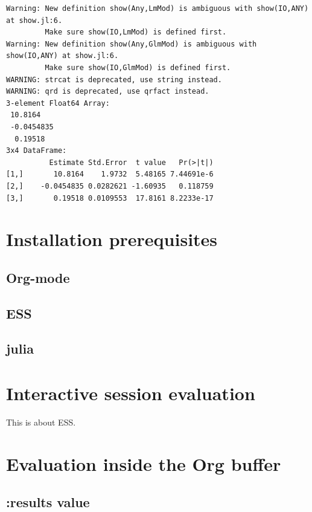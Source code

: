 \documentclass[11pt]{article}
\begin{document}
\begin{verbatim}
Warning: New definition show(Any,LmMod) is ambiguous with show(IO,ANY) at show.jl:6.
         Make sure show(IO,LmMod) is defined first.
Warning: New definition show(Any,GlmMod) is ambiguous with show(IO,ANY) at show.jl:6.
         Make sure show(IO,GlmMod) is defined first.
WARNING: strcat is deprecated, use string instead.
WARNING: qrd is deprecated, use qrfact instead.
3-element Float64 Array:
 10.8164   
 -0.0454835
  0.19518
3x4 DataFrame:
          Estimate Std.Error  t value   Pr(>|t|)
[1,]       10.8164    1.9732  5.48165 7.44691e-6
[2,]    -0.0454835 0.0282621 -1.60935   0.118759
[3,]       0.19518 0.0109553  17.8161 8.2233e-17
\end{verbatim}


\section[Installation prerequisites]{Installation prerequisites}
\label{sec-3}

\subsection[Org-mode]{Org-mode}
\label{sec-3-1}

\subsection[ESS]{ESS}
\label{sec-3-2}

\subsection[julia]{julia}
\label{sec-3-3}
\section[Interactive session evaluation]{Interactive session evaluation}
\label{sec-4}

This is about ESS.
\section[Evaluation inside the Org buffer]{Evaluation inside the Org buffer}
\label{sec-5}

\subsection[:results value]{:results value}
\label{sec-5-1}
\end{document}
